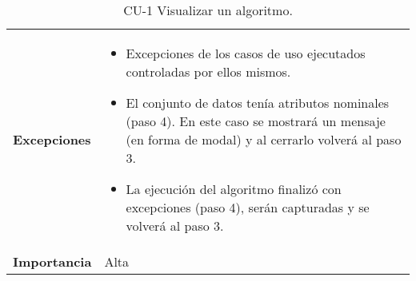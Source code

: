 \begin{table}[p]
\begin{tabularx}{\linewidth}{ p{} p{} }
		\textbf{Excepciones}          & \begin{itemize}
			\item Excepciones de los casos de uso ejecutados controladas por ellos mismos.
			\item El conjunto de datos tenía atributos nominales (paso 4). En este caso se mostrará un mensaje (en forma de modal) y al cerrarlo volverá al paso 3.
			\item La ejecución del algoritmo finalizó con excepciones (paso 4), serán capturadas y se volverá al paso 3.
		\end{itemize}	 \\
		\textbf{Importancia}          & Alta\\
		\bottomrule
	\end{tabularx}
	\caption{CU-1 Visualizar un algoritmo.}
\end{table}



